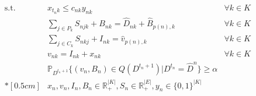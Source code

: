 \documentclass[10pt]{article}
\newcommand{\ti}{t} %
\newcommand{\ka}{k} %
\newcommand{\KA}{K}
\newcommand{\jey}{j} %
\newcommand{\Bi}{B} %
\newcommand{\Vi}{v} %
\newcommand{\Es}{S} %
\newcommand{\Zed}{z} %
\newcommand{\x}{x} %
\newcommand{\y}{y} %
\begin{document}
\begin{subequations}
\begin{flalign}
\text{s.t.} \ & \x_{\ti_n \ka} \leq c_{n \ka} \y_{n \ka} \quad  &\forall \ka  \in \KA  & \label{eq:Dyn_Sub_Setup}\\
& \sum_{j\in P_{k}} {S}_{n \jey \ka} + \Bi_{n  \ka}  = \hat{D}_{n \ka} + \hat{\Bi}_{p(n), \ka} \quad &\forall \ka  \in \KA \label{eq:Bhat} \\
& \sum_{j\in C_{k}} {S}_{n \ka \jey} + I_{n \ka} = \hat{\Vi}_{p(n), \ka}  \quad &\forall \ka  \in \KA \label{eq:vhat}\\
& \Vi_{n \ka} = I_{n  \ka} + \x_{n  \ka}  \quad &\forall \ka  \in \KA  \label{eq:vdef}
\\
& \mathbb{P}_{D^{t_n+1}}\{ ({\Vi}_{n}, {\Bi}_{n} ) \in Q(D^{\ti_n+1} )| D^{\ti_n} = \hat{D}^{n} \} \geq \alpha& \label{eq:SL}
& \\*[0.5cm]
& {x}_{ n },  {v}_{ n },  {I}_{ n } , {\Bi}_{ n } \in \mathbb{R}_{+}^{|\KA|} , {S}_{n} \in \mathbb{R}_{+}^{|E|} ,{y}_{ n } \in \{0,1\}^{|\KA|} &  & \label{eq:Dyn_F_Sub_ST_bound1}
\end{flalign}
\end{subequations}
\end{document}
